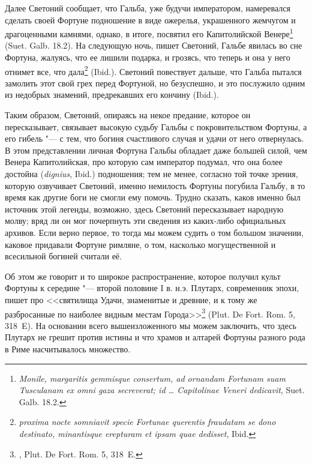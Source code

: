 Далее Светоний сообщает, что Гальба, уже будучи императором, намеревался сделать своей Фортуне подношение в виде ожерелья, украшенного жемчугом и драгоценными камнями, однако, в итоге, посвятил его Капитолийской Венере\footnote{\textit{Monile, margaritis gemmisque consertum, ad ornandam Fortunam suam Tusculanam ex omni gaza secreverat; id \ldots{} Capitolinae Veneri dedicavit}, Suet. Galb. 18.2.} (Suet. Galb. 18.2). На следующую ночь, пишет Светоний, Гальбе явилась во сне Фортуна, жалуясь, что ее лишили подарка, и грозясь, что теперь и она у него отнимет все, что дала\footnote{\textit{proxima nocte somniavit specie Fortunae querentis fraudatam se dono destinato, minantisque erepturam et ipsam quae dedisset}, Ibid.} (Ibid.). Светоний повествует дальше, что Гальба пытался замолить этот свой грех перед Фортуной, но безуспешно, и это послужило одним из недобрых знамений, предрекавших его кончину (Ibid.).

Таким образом, Светоний, опираясь на некое предание, которое он пересказывает, связывает высокую судьбу Гальбы с покровительством Фортуны, а его гибель "--- с тем, что богиня счастливого случая и удачи от него отвернулась. В этом представлении личная Фортуна Гальбы обладает даже большей силой, чем Венера Капитолийская, про которую сам император подумал, что она более достойна (\textit{dignius}, Ibid.) подношения; тем не менее, согласно той точке зрения, которую озвучивает Светоний, именно немилость Фортуны погубила Гальбу, в то время как другие боги не смогли ему помочь. Трудно сказать, каков именно был источник этой легенды, возможно, здесь Светоний пересказывает народную молву; вряд ли он мог почерпнуть эти сведения из каких-либо официальных архивов. Если верно первое, то тогда мы можем судить о том большом значении, каковое придавали Фортуне римляне, о том, насколько могущественной и всесильной богиней считали её.

Об этом же говорит и то широкое распространение, которое получил культ Фортуны к середине "--- второй половине I в. н.э. Плутарх, современник эпохи, пишет про <<святилища Удачи, знаменитые и древние, и к тому же разбросанные по наиболее видным местам Города>>\footnote{, Plut. De Fort. Rom. 5, 318~E.} (Plut. De Fort. Rom. 5, 318~E). На основании всего вышеизложенного мы можем заключить, что здесь Плутарх не грешит против истины и что храмов и алтарей Фортуны разного рода в Риме насчитывалось множество. 


